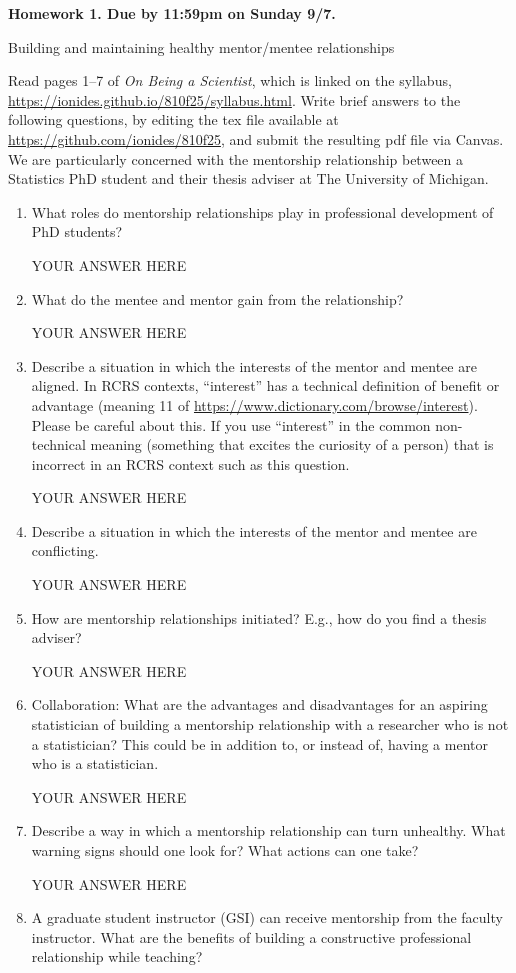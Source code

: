 \documentclass[12pt]{article}
\begin{document}
\begin{center}{\bf
Homework 1. Due by 11:59pm on Sunday 9/7.

Building and maintaining healthy mentor/mentee relationships
}\end{center}

Read pages 1--7 of {\em On Being a Scientist}, which is linked on the syllabus, \url{https://ionides.github.io/810f25/syllabus.html}. Write brief answers to the following questions, by editing the tex file available at \url{https://github.com/ionides/810f25}, and submit the resulting pdf file via Canvas. We are particularly concerned with the mentorship relationship between a Statistics PhD student and their thesis adviser at The University of Michigan.

\begin{enumerate}
\item What roles do mentorship relationships play in professional development of PhD students? 

YOUR ANSWER HERE

\item What do the mentee and mentor gain from the relationship?

YOUR ANSWER HERE

\item Describe a situation in which the interests of the mentor and mentee are aligned. In RCRS contexts, ``interest'' has a technical definition of benefit or advantage (meaning 11 of \url{https://www.dictionary.com/browse/interest}). Please be careful about this. If you use ``interest'' in the common non-technical meaning (something that excites the curiosity of a person) that is incorrect in an RCRS context such as this question.

YOUR ANSWER HERE

\item Describe a situation in which the interests of the mentor and mentee are conflicting. 

YOUR ANSWER HERE

\item How are mentorship relationships initiated? E.g., how do you find a thesis adviser?

YOUR ANSWER HERE

\item Collaboration: What are the advantages and disadvantages for an aspiring statistician of building a mentorship relationship with a researcher who is not a statistician? This could be in addition to, or instead of, having a mentor who is a statistician.

YOUR ANSWER HERE

\item Describe a way in which a mentorship relationship can turn unhealthy. What warning signs should one look for? What actions can one take?

YOUR ANSWER HERE

\item A graduate student instructor (GSI) can receive mentorship from the faculty instructor. What are the benefits of building a constructive professional relationship while teaching?
  
\end{enumerate}
\end{document}
